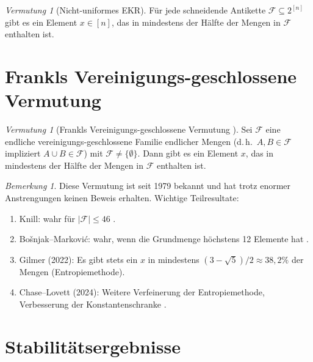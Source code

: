 \documentclass[12pt,a4paper]{amsart}
\theoremstyle{definition}
\theoremstyle{remark}
\newtheorem{vermutung}[theorem]{Vermutung}
\newtheorem{bemerkung}[theorem]{Bemerkung}
\begin{document}
\begin{vermutung}[Nicht-uniformes EKR]\label{verm:nicht_uniform}
Für jede schneidende Antikette $\mathcal{F} \subseteq 2^{[n]}$ gibt es ein
Element $x \in [n]$, das in mindestens der Hälfte der Mengen in $\mathcal{F}$
enthalten ist.
\end{vermutung}

\section{Frankls Vereinigungs-geschlossene Vermutung}\label{sec:vereinigung}

\begin{vermutung}[Frankls Vereinigungs-geschlossene Vermutung \cite{Frankl1979}]
\label{verm:frankl_vg}
Sei $\mathcal{F}$ eine endliche vereinigungs-geschlossene Familie endlicher Mengen
(d.\,h.\ $A, B \in \mathcal{F}$ impliziert $A \cup B \in \mathcal{F}$) mit
$\mathcal{F} \neq \{\emptyset\}$. Dann gibt es ein Element $x$, das in mindestens
der Hälfte der Mengen in $\mathcal{F}$ enthalten ist.
\end{vermutung}

\begin{bemerkung}
Diese Vermutung ist seit 1979 bekannt und hat trotz enormer Anstrengungen keinen
Beweis erhalten. Wichtige Teilresultate:
\begin{enumerate}[label=(\roman*)]
  \item Knill: wahr für $|\mathcal{F}| \leq 46$ \cite{Knill1994}.
  \item Bošnjak--Marković: wahr, wenn die Grundmenge höchstens 12 Elemente hat
        \cite{BosnjacMarkovic2008}.
  \item Gilmer (2022): Es gibt stets ein $x$ in mindestens $(3-\sqrt{5})/2 \approx 38{,}2\%$
        der Mengen \cite{Gilmer2022} (Entropiemethode).
  \item Chase--Lovett (2024): Weitere Verfeinerung der Entropiemethode,
        Verbesserung der Konstantenschranke \cite{ChaseLovett2024}.
\end{enumerate}
\end{bemerkung}

\section{Stabilitätsergebnisse}\label{sec:stabilitaet}
\end{document}
